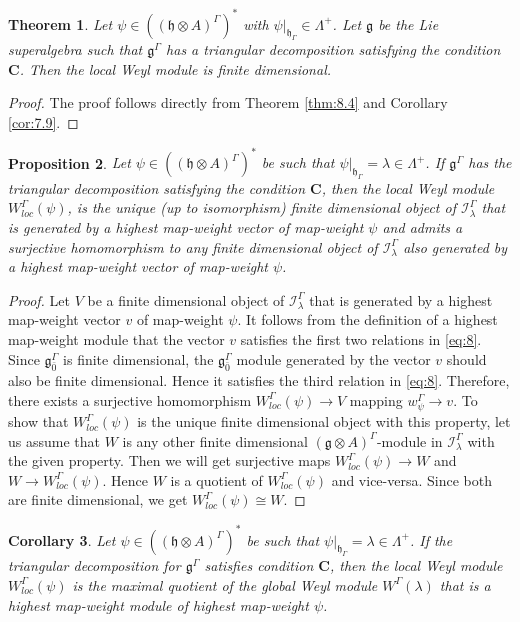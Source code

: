 \documentclass[11pt]{amsart}
\theoremstyle{plain}
\newtheorem{thm}{Theorem}[section]
\newtheorem{prop}[thm]{Proposition}
\newtheorem{cor}[thm]{Corollary}
\theoremstyle{definition}
\newcommand{\g}{\mathfrak{g}}
\newcommand{\h}{\mathfrak{h}}
\newcommand{\lw}{w_{\psi}^{\Gamma}}
\newcommand{\LW}{W_{loc}^{\Gamma}(\psi)}
\begin{document}
\begin{thm}
Let $\psi\in((\h\otimes A)^{\Gamma})^{*}$ with $\psi|_{\h_{\Gamma}}\in\Lambda^{+}$. Let $\g$ be the Lie superalgebra such that $\g^{\Gamma}$ has a triangular decomposition satisfying the condition $\mathbf{C}$. Then the local Weyl module is finite dimensional.
\end{thm}
\begin{proof}
    The proof follows directly from Theorem \ref{thm:8.4} and Corollary \ref{cor:7.9}.
\end{proof}
\begin{prop}
Let $\psi\in((\h\otimes A)^{\Gamma})^{*}$ be such that $\psi|_{\h_{\Gamma}}=\lambda\in\Lambda^{+}$. If $\g^{\Gamma}$ has the triangular decomposition satisfying the condition $\mathbf{C}$, then the local Weyl module $\LW$, is the unique (up to isomorphism) finite dimensional object of $\mathcal{I}_{\lambda}^{\Gamma}$ that is generated by a highest map-weight vector of  map-weight $\psi$ and admits a surjective homomorphism to any finite dimensional object of $\mathcal{I}_{\lambda}^{\Gamma}$ also generated by a highest map-weight vector of map-weight $\psi$.
\end{prop}
\begin{proof}
Let $V$ be a finite dimensional object of $\mathcal{I}_{\lambda}^{\Gamma}$ that is generated by a highest map-weight vector $v$ of map-weight $\psi$. It follows from the definition of a highest map-weight module that the vector $v$ satisfies the first two relations in \eqref{eq:8}. Since $\g_{\bar{0}}^{\Gamma}$ is finite dimensional, the $\g_{\bar{0}}^{\Gamma}$ module generated by the vector $v$ should also be finite dimensional. Hence it satisfies the third relation in \eqref{eq:8}. Therefore, there exists a surjective homomorphism $\LW\rightarrow V$ mapping $\lw\rightarrow v$. To show that $\LW$ is the unique finite dimensional object with this property, let us assume that $W$ is any other finite dimensional $(\g\otimes A)^{\Gamma}$-module in $\mathcal{I}_{\lambda}^{\Gamma}$ with the given property. Then we will get surjective maps $\LW\rightarrow W$ and $W\rightarrow\LW$. Hence $W$ is a quotient of $\LW$ and vice-versa. Since both are finite dimensional, we get $\LW\cong W$. 
\end{proof}
\begin{cor}
Let $\psi\in((\h\otimes A)^{\Gamma})^{*}$ be such that $\psi|_{\h_{\Gamma}}=\lambda\in\Lambda^{+}$. If the triangular decomposition for $\g^{\Gamma}$ satisfies condition $\mathbf{C}$, then the local Weyl module $\LW$ is the maximal quotient of the global Weyl module $W^{\Gamma}(\lambda)$ that is a highest map-weight module of highest map-weight $\psi$.
\end{cor}
\end{document}
